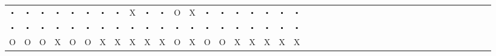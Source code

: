 \documentclass[fontscale=0.38]{baposter}
\begin{document}
\begin{poster}
{{\begin{center}
\begin{tabular}{cccccccccccccccccccccccccccccccccccccccccc}
    $\centerdot$&$\centerdot$&$\centerdot$&$\centerdot$&$\centerdot$&$\centerdot$&$\centerdot$&$\centerdot$&X&$\centerdot$&$\centerdot$&O&X&$\centerdot$&$\centerdot$&$\centerdot$&$\centerdot$&$\centerdot$&$\centerdot$&$\centerdot$\\
    $\centerdot$&$\centerdot$&$\centerdot$&$\centerdot$&$\centerdot$&$\centerdot$&$\centerdot$&$\centerdot$&$\centerdot$&$\centerdot$&$\centerdot$&$\centerdot$&$\centerdot$&$\centerdot$&$\centerdot$&$\centerdot$&$\centerdot$&$\centerdot$&$\centerdot$&$\centerdot$\\
    O&O&O&X&O&O&X&X&X&X&X&O&X&O&O&X&X&X&X&X\\
    \end{tabular} \end{center} 

  }\parbox[b]{.3\textwidth}{
     
}}
\end{poster}
\end{document}
